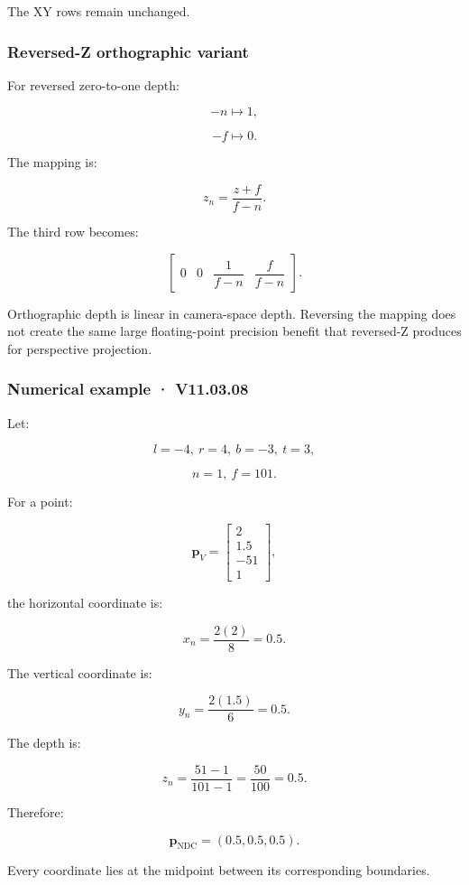 The XY rows remain unchanged.

\subsubsection{Reversed-Z orthographic variant}\label{reversed-z-orthographic-variant}

For reversed zero-to-one depth:

\[
 -n\mapsto1,
\]

\[
 -f\mapsto0.
\]

The mapping is:

\[
 \boxed{ z_n=\frac{z+f}{f-n} }.
\]

The third row becomes:

\[
 \begin{bmatrix} 0&0&\dfrac1{f-n}&\dfrac f{f-n} \end{bmatrix}.
\]

Orthographic depth is linear in camera-space depth. Reversing the mapping does not create the same large floating-point precision benefit that reversed-Z produces for perspective projection.

\subsubsection{Numerical example · V11.03.08}\label{numerical-example-v11.03.08}

Let:

\[
 l=-4,\ r=4,\ b=-3,\ t=3,
\]

\[
 n=1,\ f=101.
\]

For a point:

\[
 \mathbf p_V= \begin{bmatrix}2\\1.5\\-51\\1\end{bmatrix},
\]

the horizontal coordinate is:

\[
 x_n=\frac{2(2)}8=0.5.
\]

The vertical coordinate is:

\[
 y_n=\frac{2(1.5)}6=0.5.
\]

The depth is:

\[
 z_n=\frac{51-1}{101-1}=\frac{50}{100}=0.5.
\]

Therefore:

\[
 \boxed{ \mathbf p_{\mathrm{NDC}}=(0.5,0.5,0.5) }.
\]

Every coordinate lies at the midpoint between its corresponding boundaries.

